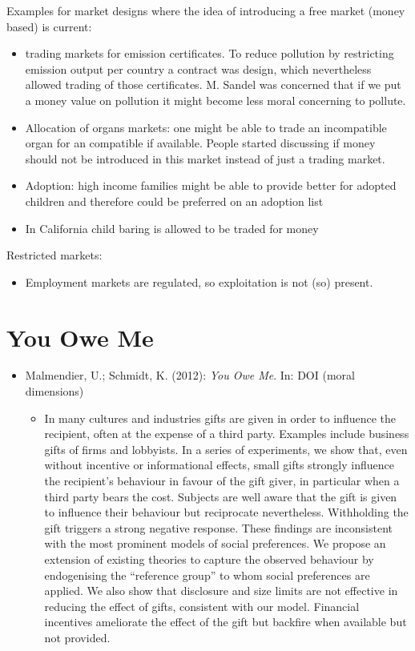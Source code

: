 Examples for market designs where the idea of introducing a free market (money based) is current:
\begin{itemize}
	\item trading markets for emission certificates. To reduce pollution by restricting emission output per country a contract was design, which nevertheless allowed trading of those certificates. M. Sandel was concerned that if we put a money value on pollution it might become less moral concerning to pollute.
	\item Allocation of organs markets: one might be able to trade an incompatible organ for an compatible if available. People started discussing if money should not be introduced in this market instead of just a trading market.
	\item Adoption: high income families might be able to provide better for adopted children and therefore could be preferred on an adoption list
	\item In California child baring is allowed to be traded for money 
\end{itemize}

Restricted markets:

\begin{itemize}
	\item Employment markets are regulated, so exploitation is not (so) present.
\end{itemize}
		
\section{You Owe Me}
\begin{itemize}
	\item Malmendier, U.; Schmidt, K. (2012): \textit{You Owe Me}. In: DOI (moral dimensions)
		\begin{itemize}
			\item In many cultures and industries gifts are given in order to influence the recipient, often at the expense of a third party. Examples include business gifts of firms and lobbyists. In a series of experiments, we show that, even without incentive or informational effects, small gifts strongly influence the recipient’s behaviour in favour of the gift giver, in particular when a third party bears the cost. Subjects are well aware that the gift is given to influence their behaviour but reciprocate nevertheless. Withholding the gift triggers a strong negative response. These findings are inconsistent with the most prominent models of social preferences. We propose an extension of existing theories to capture the observed behaviour by endogenising the “reference group” to whom social preferences are applied. We also show that disclosure and size limits are not effective in reducing the effect of gifts, consistent with our model. Financial incentives ameliorate the effect of the gift but backfire when available but not provided.
		\end{itemize}
\end{itemize}

